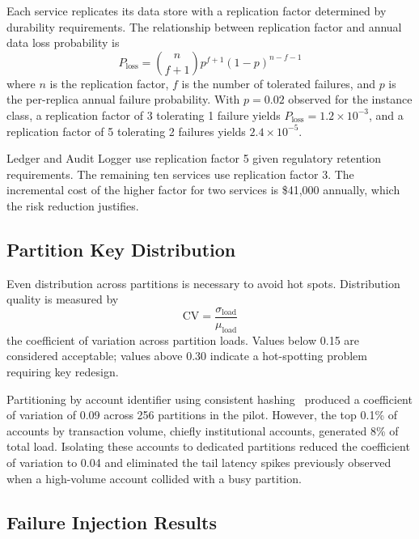 Each service replicates its data store with a replication factor determined by durability requirements. The relationship between replication factor and annual data loss probability is
\begin{equation}
\label{eq:replication-factor}
P_{\text{loss}} = \binom{n}{f+1} p^{f+1}(1-p)^{n-f-1}
\end{equation}
where $n$ is the replication factor, $f$ is the number of tolerated failures, and $p$ is the per-replica annual failure probability. With $p = 0.02$ observed for the instance class, a replication factor of 3 tolerating 1 failure yields $P_{\text{loss}} = 1.2 \times 10^{-3}$, and a replication factor of 5 tolerating 2 failures yields $2.4 \times 10^{-5}$.

Ledger and Audit Logger use replication factor 5 given regulatory retention requirements. The remaining ten services use replication factor 3. The incremental cost of the higher factor for two services is \$41,000 annually, which the risk reduction justifies.

\subsection{Partition Key Distribution}

Even distribution across partitions is necessary to avoid hot spots. Distribution quality is measured by
\begin{equation}
\label{eq:partition-key-distribution}
\text{CV} = \frac{\sigma_{\text{load}}}{\mu_{\text{load}}}
\end{equation}
the coefficient of variation across partition loads. Values below 0.15 are considered acceptable; values above 0.30 indicate a hot-spotting problem requiring key redesign.

Partitioning by account identifier using consistent hashing~\cite{karger-consistent-hashing-1997} produced a coefficient of variation of 0.09 across 256 partitions in the pilot. However, the top 0.1\% of accounts by transaction volume, chiefly institutional accounts, generated 8\% of total load. Isolating these accounts to dedicated partitions reduced the coefficient of variation to 0.04 and eliminated the tail latency spikes previously observed when a high-volume account collided with a busy partition.

\subsection{Failure Injection Results}

